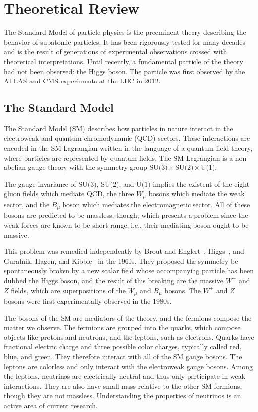 \chapter[Theoretical Review][Theoretical Review]{Theoretical Review}
\label{chap:standardmodel}

The Standard Model of particle physics is the preeminent theory describing the behavior of subatomic particles. It has been rigorously tested for many decades and is the result of generations of experimental observations crossed with theoretical interpretations. Until recently, a fundamental particle of the theory had not been observed: the Higgs boson. The particle was first observed by the ATLAS and CMS experiments at the LHC in 2012.

\section{The Standard Model}

The Standard Model (SM) describes how particles in nature interact in the electroweak and quantum chromodynamic (QCD) sectors. These interactions are encoded in the SM Lagrangian written in the language of a quantum field theory, where particles are represented by quantum fields. The SM Lagrangian is a non-abelian gauge theory with the symmetry group $\text{SU(3)}\times\text{SU(2)}\times\text{U(1)}$. 

The gauge invariance of $\text{SU(3)}$, $\text{SU(2)}$, and $\text{U(1)}$ implies the existent of the eight gluon fields which mediate QCD, the three $W_\mu$ bosons which mediate the weak sector, and the $B_\mu$ boson which mediates the electromagnetic sector. All of these bosons are predicted to be massless, though, which presents a problem since the weak forces are known to be short range, i.e., their mediating boson ought to be massive.

This problem was remedied independently by Brout and Englert~\cite{1964.Englert.symmetry_breaking}, Higgs~\cite{1964.Higgs.Broken_Symmetries_1,1964.Higgs.Broken_Symmetries_2}, and Guralnik, Hagen, and Kibble~\cite{1964.Guralnik-Hagen-Kibble.symmetry_breaking} in the 1960s. They proposed the symmetry be spontaneously broken by a new scalar field whose accompanying particle has been dubbed the Higgs boson, and the result of this breaking are the massive $W^\pm$ and $Z$ fields, which are superpositions of the $W_\mu$ and $B_\mu$ bosons. The $W^\pm$ and $Z$ bosons were first experimentally observed in the 1980s.

The bosons of the SM are mediators of the theory, and the fermions compose the matter we observe. The fermions are grouped into the quarks, which compose objects like protons and neutrons, and the leptons, such as electrons. Quarks have fractional electric charge and three possible color charges, typically called red, blue, and green. They therefore interact with all of the SM gauge bosons. The leptons are colorless and only interact with the electroweak gauge bosons. Among the leptons, neutrinos are electrically neutral and thus only participate in weak interactions. They are also have small mass relative to the other SM fermions, though they are not massless. Understanding the properties of neutrinos is an active area of current research.

